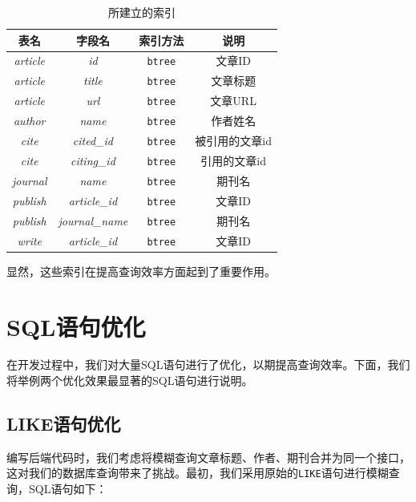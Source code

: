 \documentclass[UTF8,openany]{ctexbook}
\begin{document}
\begin{table}[H]
    \centering
    \begin{tabular}{|c|c|c|c|}
        \hline
        \textbf{表名} & \textbf{字段名} & \textbf{索引方法} & \textbf{说明} \\
        \hline
        \textit{article} & \textit{id} & \texttt{btree} & 文章ID \\
        \hline
        \textit{article} & \textit{title} & \texttt{btree} & 文章标题 \\
        \hline
        \textit{article} & \textit{url} & \texttt{btree} & 文章URL \\
        \hline
        \textit{author} & \textit{name} & \texttt{btree} & 作者姓名 \\
        \hline
        \textit{cite} & \textit{cited\_id} & \texttt{btree} & 被引用的文章id \\
        \hline
        \textit{cite} & \textit{citing\_id} & \texttt{btree} & 引用的文章id \\
        \hline
        \textit{journal} & \textit{name} & \texttt{btree} & 期刊名 \\
        \hline
        \textit{publish} & \textit{article\_id} & \texttt{btree} & 文章ID \\
        \hline
        \textit{publish} & \textit{journal\_name} & \texttt{btree} & 期刊名 \\
        \hline
        \textit{write} & \textit{article\_id} & \texttt{btree} & 文章ID \\
        \hline
    \end{tabular}
    \caption{所建立的索引}
\end{table}

显然，这些索引在提高查询效率方面起到了重要作用。

\section{SQL语句优化}

在开发过程中，我们对大量SQL语句进行了优化，以期提高查询效率。下面，我们将举例两个优化效果最显著的SQL语句进行说明。

\subsection{LIKE语句优化}

编写后端代码时，我们考虑将模糊查询文章标题、作者、期刊合并为同一个接口，这对我们的数据库查询带来了挑战。最初，我们采用原始的\texttt{LIKE}语句进行模糊查询，SQL语句如下：
\end{document}
